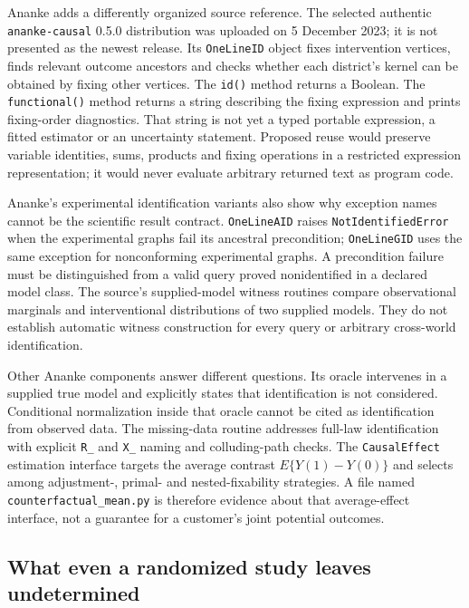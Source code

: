 Ananke adds a differently organized source reference. The selected authentic
\texttt{ananke-causal} 0.5.0 distribution was uploaded on 5 December 2023; it is
not presented as the newest release. Its \texttt{OneLineID} object fixes
intervention vertices, finds relevant outcome ancestors and checks whether
each district's kernel can be obtained by fixing other vertices. The \texttt{id()}
method returns a Boolean. The \texttt{functional()} method returns a string
describing the fixing expression and prints fixing-order diagnostics. That
string is not yet a typed portable expression, a fitted estimator or an
uncertainty statement. Proposed reuse would preserve variable identities,
sums, products and fixing operations in a restricted expression representation;
it would never evaluate arbitrary returned text as program code.
\citep{exec18_pyid_one_line,exec18_pyid_contract}

Ananke's experimental identification variants also show why exception names
cannot be the scientific result contract. \texttt{OneLineAID} raises
\texttt{NotIdentifiedError} when the experimental graphs fail its ancestral
precondition; \texttt{OneLineGID} uses the same exception for nonconforming
experimental graphs. A precondition failure must be distinguished from a
valid query proved nonidentified in a declared model class. The source's
supplied-model witness routines compare observational marginals and
interventional distributions of two supplied models. They do not establish
automatic witness construction for every query or arbitrary cross-world
identification.~\citep{exec18_pyid_one_line}

Other Ananke components answer different questions. Its oracle intervenes in a
supplied true model and explicitly states that identification is not considered.
Conditional normalization inside that oracle cannot be cited as identification
from observed data. The missing-data routine addresses full-law identification
with explicit \texttt{R\_} and \texttt{X\_} naming and colluding-path checks.
The \texttt{CausalEffect} estimation interface targets the average contrast
$E\{Y(1)-Y(0)\}$ and selects among adjustment-, primal- and nested-fixability
strategies. A file named \texttt{counterfactual\_mean.py} is therefore evidence
about that average-effect interface, not a guarantee for a customer's joint
potential outcomes.~\citep{exec18_pyid_oracle,exec18_pyid_missing,exec18_pyid_mean}

\subsection{What even a randomized study leaves undetermined}
\label{exec18:pyid-coupling}

